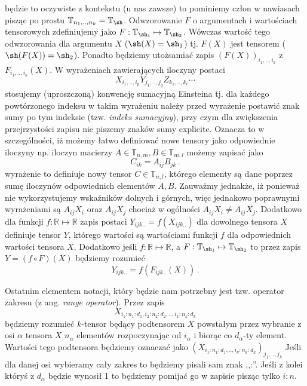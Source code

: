 \documentclass{myclass}
\begin{document}
będzie to oczywiste z kontekstu (u nas zawsze) to pominiemy człon w nawiasach pisząc po prostu
\(\mathbb{T}_{n_1,..,n_k} = \mathbb{T}_\sh\). Odwzorowanie \(F\) o argumentach i wartościach
tensorowych zdefiniujemy jako \(F: \mathbb{T}_{\sh_1} \mapsto \mathbb{T}_{\sh_2}\). Wówczas wartość
tego odwzorowania dla argumentu \(X\) (\(\sh(X) = \sh_1\)) tj. \(F(X)\) jest tensorem (\(\sh(F(X)) =
\sh_2\)). Ponadto będziemy utożsamiać zapis \((F(X))_{i_1,..,i_k}\) z \(F_{i_1,..,i_k}(X)\).\hfill
\break
W wyrażeniach zawierających iloczyny postaci 
\begin{equation*}
    X_{i_1,..,i_p}Y_{j_1,..,j_q}Z_{k_1,..,k_r}\cdots
\end{equation*}
stosujemy (uproszczoną) konwencję sumacyjną Einsteina tj. dla każdego powtórzonego indeksu w takim
wyrażeniu należy przed wyrażenie postawić znak sumy po tym indeksie (tzw. \textit{indeks
sumacyjny}), przy czym dla zwiększenia przejrzystości zapisu nie piszemy znaków sumy explicite.
Oznacza to w szczególności, iż możemy łatwo definiować nowe tensory jako odpowiednie iloczyny np.
iloczyn macierzy \(A \in \mathbb{T}_{n,m}, B \in \mathbb{T}_{m,l}\) możemy zapisać jako
\begin{equation*}
    C_{ik} = A_{ij}B_{jk}\,.
\end{equation*}
wyrażenie to definiuje nowy tensor \(C \in \mathbb{T}_{n, l}\), którego elementy są dane poprzez
sumę iloczynów odpowiednich elementów \(A, B\). Zauważmy jednakże, iż ponieważ nie wykorzystujemy
wskaźników dolnych i górnych, więc jednakowo poprawnymi wyrażeniami są \(A_{ij}X_i\) oraz
\(A_{ij}X_j\) chociaż w ogólności \(A_{ij}X_i \neq A_{ij}X_j\). Dodatkowo dla funkcji \(f:
\mathbb{R} \mapsto \mathbb{R}\) zapis postaci \(Y_{ijk..} = f(X_{ijk..})\) dla dowolnego tensora
\(X\) definiuje tensor \(Y\), którego wartości są wartościami funkcji \(f\) dla odpowiednich
wartości tensora \(X\). Dodatkowo jeśli \(f: \mathbb{R} \mapsto \mathbb{R}\), a \(F :
\mathbb{T}_{\sh_1} \mapsto \mathbb{T}_{\sh_2}\) to przez zapis \(Y = (f \circ F)(X)\) będziemy
rozumieć 
\begin{equation*}
    Y_{ijk..} = f(F_{ijk..}(X))\,.
\end{equation*}

Ostatnim elementem notacji, który będzie nam potrzebny jest tzw. operator zakresu (z ang.
\textit{range operator}). Przez zapis 
\begin{equation*} 
    X_{i_1:n_1:d_1, i_2:n_2:d_2,..,i_k:n_k:d_k}
\end{equation*} 
będziemy rozumieć \(k\)-tensor będący podtensorem \(X\) powstałym przez wybranie z osi \(\alpha\)
tensora \(X\) \(n_\alpha\) elementów rozpoczynając od \(i_\alpha\) i biorąc co \(d_\alpha\)-ty
element. Wartości tego podtensora będziemy oznaczać jako
\((X_{i_1:n_1:d_1,..,i_k:n_k:d_k})_{j_1,..,j_k}\) Jeśli dla danej osi wybieramy cały zakres to
będziemy pisali sam znak ,,:''. Jeśli z kolei któryś z \(d_\alpha\) będzie wynosił 1 to będziemy
pomijać go w zapisie pisząc tylko \(i:n\).
\end{document}

